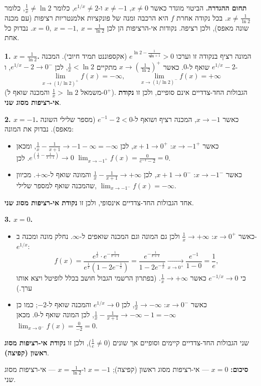 \begin{solution}
\textbf{תחום ההגדרה.} הביטוי מוגדר כאשר $x\neq0$, $x\neq-1$ ו-$e^{1/x}\neq 2$, כלומר $\frac1x\neq\ln2$, כלומר $x\neq\frac1{\ln2}$. בכל נקודה אחרת $f$ היא הרכבה ומנה של פונקציות אלמנטריות רציפות (עם מכנה שונה מאפס), ולכן רציפה. נקודות אי-הרציפות הן לכן $x=0,\ x=-1,\ x=\frac{1}{\ln2}$. נבדוק כל אחת.

\textbf{1. $x=\frac1{\ln2}$.} המונה רציף בנקודה זו וערכו
$e^{\ln2-\frac{1}{\frac1{\ln2}+1}}>0$ (אקספוננט תמיד חיובי). המכנה $e^{1/x}-2$ שואף ל-$0$. כאשר $x\to\left(\frac1{\ln2}\right)^+$ מתקיים $\frac1x<\ln2$, לכן $e^{1/x}-2\to0^-$, ו-
\[ \lim_{x\to(1/\ln2)^+}f(x)=-\infty, \qquad \lim_{x\to(1/\ln2)^-}f(x)=+\infty \]
(משמאל $\frac1x>\ln2$ והמכנה שואף ל-$0^+$). הגבולות החד-צדדיים אינם סופיים, ולכן זו \textbf{נקודת אי-רציפות מסוג שני}.

\textbf{2. $x=-1$.} כאשר $x\to-1$, המכנה רציף ושואף ל-$e^{-1}-2<0$ (מספר שלילי השונה מאפס). נבדוק את המונה:
\begin{itemize}
  \item כאשר $x\to-1^+$: $x+1\to0^+$, לכן $\frac1x-\frac1{x+1}\to-1-\infty=-\infty$, ומכאן $e^{\left(\frac1x-\frac1{x+1}\right)}\to0$. לכן $\lim_{x\to-1^+}f(x)=\frac{0}{e^{-1}-2}=0$.
  \item כאשר $x\to-1^-$: $x+1\to0^-$, לכן $\frac1x-\frac1{x+1}\to+\infty$ והמונה שואף ל-$+\infty$. מכיוון שהמכנה שואף למספר שלילי, $\lim_{x\to-1^-}f(x)=-\infty$.
\end{itemize}
אחד הגבולות החד-צדדיים אינסופי, ולכן זו \textbf{נקודת אי-רציפות מסוג שני}.

\textbf{3. $x=0$.}
\begin{itemize}
  \item כאשר $x\to0^+$: $\frac1x\to+\infty$ ולכן גם המונה וגם המכנה שואפים ל-$\infty$. נחלק מונה ומכנה ב-$e^{1/x}$:
  \[ f(x)=\frac{e^{\frac1x}\cdot e^{-\frac1{x+1}}}{e^{\frac1x}\left(1-2e^{-\frac1x}\right)}=\frac{e^{-\frac{1}{x+1}}}{1-2e^{-\frac1x}}\xrightarrow[x\to0^+]{}\frac{e^{-1}}{1-0}=\frac1e, \]
  כי $e^{-1/x}\to0$ כאשר $\frac1x\to+\infty$. (בפתרון הרשמי הגבול חושב בכלל לופיטל ויצא אותו ערך.)
  \item כאשר $x\to0^-$: $\frac1x\to-\infty$, לכן $e^{1/x}\to0$ והמכנה שואף ל-$-2$; כמו כן $\frac1x-\frac1{x+1}\to-\infty-1=-\infty$, לכן המונה שואף ל-$0$. מכאן $\lim_{x\to0^-}f(x)=\frac{0}{-2}=0$.
\end{itemize}
שני הגבולות החד-צדדיים קיימים וסופיים אך שונים ($\frac1e\neq0$), ולכן זו \textbf{נקודת אי-רציפות מסוג ראשון (קפיצה)}.

\textbf{סיכום:} $x=0$ — אי-רציפות מסוג ראשון (קפיצה); $x=-1$ ו-$x=\frac1{\ln2}$ — אי-רציפות מסוג שני.
\end{solution}
